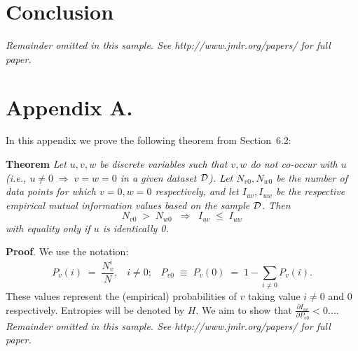 \documentclass[twoside,11pt]{article}
\newcommand{\dataset}{{\cal D}}
\newcommand{\fracpartial}[2]{\frac{\partial #1}{\partial  #2}}
\begin{document}
\section{Conclusion}

{\noindent \em Remainder omitted in this sample. See http://www.jmlr.org/papers/ for full paper.}




\newpage

\appendix
\section*{Appendix A.}
\label{app:theorem}



In this appendix we prove the following theorem from
Section~6.2:

\noindent
{\bf Theorem} {\it Let $u,v,w$ be discrete variables such that $v, w$ do
not co-occur with $u$ (i.e., $u\neq0\;\Rightarrow \;v=w=0$ in a given
dataset $\dataset$). Let $N_{v0},N_{w0}$ be the number of data points for
which $v=0, w=0$ respectively, and let $I_{uv},I_{uw}$ be the
respective empirical mutual information values based on the sample
$\dataset$. Then
\[
	N_{v0} \;>\; N_{w0}\;\;\Rightarrow\;\;I_{uv} \;\leq\;I_{uw}
\]
with equality only if $u$ is identically 0.} \hfill\BlackBox

\noindent
{\bf Proof}. We use the notation:
\[
P_v(i) \;=\;\frac{N_v^i}{N},\;\;\;i \neq 0;\;\;\;
P_{v0}\;\equiv\;P_v(0)\; = \;1 - \sum_{i\neq 0}P_v(i).
\]
These values represent the (empirical) probabilities of $v$
taking value $i\neq 0$ and 0 respectively.  Entropies will be denoted
by $H$. We aim to show that $\fracpartial{I_{uv}}{P_{v0}} < 0$....\\

{\noindent \em Remainder omitted in this sample. See http://www.jmlr.org/papers/ for full paper.}

\vskip 0.2in

\end{document}
